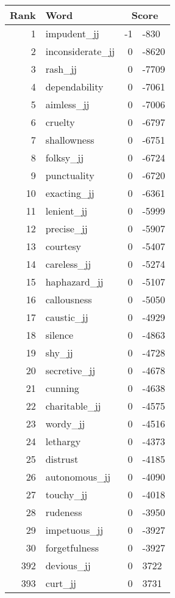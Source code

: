 \begin{longtable}[!htbp]{| rlr@{.}l |}
    \hline
    \textbf{Rank} & \textbf{Word} & \multicolumn{2}{c|}{\textbf{Score}} \\
    \hline
    \endhead
    1 & impudent\_jj & -1 & -830 \\
    2 & inconsiderate\_jj & 0 & -8620 \\
    3 & rash\_jj & 0 & -7709 \\
    4 & dependability & 0 & -7061 \\
    5 & aimless\_jj & 0 & -7006 \\
    6 & cruelty & 0 & -6797 \\
    7 & shallowness & 0 & -6751 \\
    8 & folksy\_jj & 0 & -6724 \\
    9 & punctuality & 0 & -6720 \\
    10 & exacting\_jj & 0 & -6361 \\
    11 & lenient\_jj & 0 & -5999 \\
    12 & precise\_jj & 0 & -5907 \\
    13 & courtesy & 0 & -5407 \\
    14 & careless\_jj & 0 & -5274 \\
    15 & haphazard\_jj & 0 & -5107 \\
    16 & callousness & 0 & -5050 \\
    17 & caustic\_jj & 0 & -4929 \\
    18 & silence & 0 & -4863 \\
    19 & shy\_jj & 0 & -4728 \\
    20 & secretive\_jj & 0 & -4678 \\
    21 & cunning & 0 & -4638 \\
    22 & charitable\_jj & 0 & -4575 \\
    23 & wordy\_jj & 0 & -4516 \\
    24 & lethargy & 0 & -4373 \\
    25 & distrust & 0 & -4185 \\
    26 & autonomous\_jj & 0 & -4090 \\
    27 & touchy\_jj & 0 & -4018 \\
    28 & rudeness & 0 & -3950 \\
    29 & impetuous\_jj & 0 & -3927 \\
    30 & forgetfulness & 0 & -3927 \\
    392 & devious\_jj & 0 & 3722 \\
    393 & curt\_jj & 0 & 3731 \\

\end{longtable}
